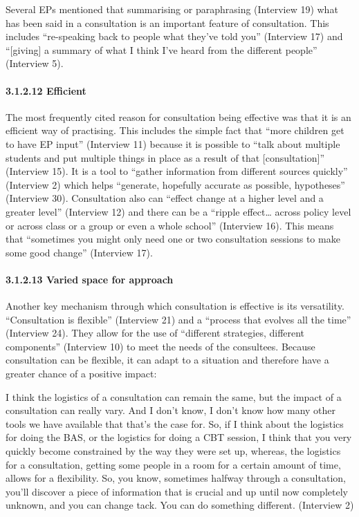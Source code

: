 \documentclass[
]{article}
\begin{document}
Several EPs mentioned that summarising or paraphrasing (Interview 19)
what has been said in a consultation is an important feature of
consultation. This includes ``re-speaking back to people what they've
told you'' (Interview 17) and ``{[}giving{]} a summary of what I think
I've heard from the different people'' (Interview 5).

\hypertarget{efficient}{%
\paragraph{3.1.2.12 Efficient}\label{efficient}}

The most frequently cited reason for consultation being effective was
that it is an efficient way of practising. This includes the simple fact
that ``more children get to have EP input'' (Interview 11) because it is
possible to ``talk about multiple students and put multiple things in
place as a result of that {[}consultation{]}'' (Interview 15). It is a
tool to ``gather information from different sources quickly'' (Interview
2) which helps ``generate, hopefully accurate as possible, hypotheses''
(Interview 30). Consultation also can ``effect change at a higher level
and a greater level'' (Interview 12) and there can be a ``ripple
effect\ldots{} across policy level or across class or a group or even a
whole school'' (Interview 16). This means that ``sometimes you might
only need one or two consultation sessions to make some good change''
(Interview 17).

\hypertarget{varied-space-for-approach}{%
\paragraph{3.1.2.13 Varied space for
approach}\label{varied-space-for-approach}}

Another key mechanism through which consultation is effective is its
versatility. ``Consultation is flexible'' (Interview 21) and a ``process
that evolves all the time'' (Interview 24). They allow for the use of
``different strategies, different components'' (Interview 10) to meet
the needs of the consultees. Because consultation can be flexible, it
can adapt to a situation and therefore have a greater chance of a
positive impact:

I think the logistics of a consultation can remain the same, but the
impact of a consultation can really vary. And I don't know, I don't know
how many other tools we have available that that's the case for. So, if
I think about the logistics for doing the BAS, or the logistics for
doing a CBT session, I think that you very quickly become constrained by
the way they were set up, whereas, the logistics for a consultation,
getting some people in a room for a certain amount of time, allows for a
flexibility. So, you know, sometimes halfway through a consultation,
you'll discover a piece of information that is crucial and up until now
completely unknown, and you can change tack. You can do something
different. (Interview 2)
\end{document}
